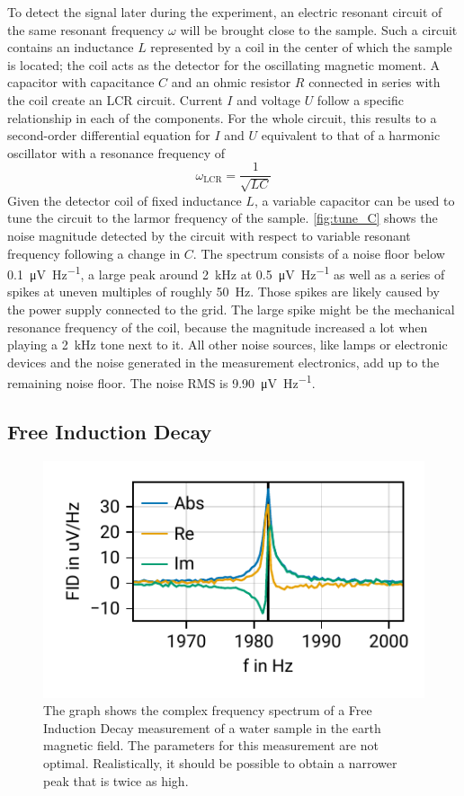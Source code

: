 \documentclass[
    parskip=half, 
    twoside=false,
    twocolumn=true,
    fontsize=11pt,
]{scrarticle}
\begin{document}
To detect the signal later during the experiment, an electric resonant circuit of the same resonant frequency $\omega$ will be brought close to the sample. Such a circuit contains an inductance $L$ represented by a coil in the center of which the sample is located; the coil acts as the detector for the oscillating magnetic moment. A capacitor with capacitance $C$ and an ohmic resistor $R$ connected in series with the coil create an LCR circuit. Current $I$ and voltage $U$ follow a specific relationship in each of the components. For the whole circuit, this results to a second-order differential equation for $I$ and $U$ equivalent to that of a harmonic oscillator with a resonance frequency of
\begin{equation}
    \label{eq:LCR_frequency}
    \omega_{\text{LCR}} = \frac{1}{\sqrt{LC}}
\end{equation}
Given the detector coil of fixed inductance $L$, a variable capacitor can be used to tune the circuit to the larmor frequency of the sample. \autoref{fig:tune_C} shows the noise magnitude detected by the circuit with respect to variable resonant frequency following a change in $C$. The spectrum consists of a noise floor below \SI{0.1}{\micro \volt \per \hertz}, a large peak around \SI{2}{\kilo \hertz} at \SI{0.5}{\micro \volt \per \hertz} as well as a series of spikes at uneven multiples of roughly \SI{50}{\hertz}. Those spikes are likely caused by the power supply connected to the grid. The large spike might be the mechanical resonance frequency of the coil, because the magnitude increased a lot when playing a \SI{2}{\kilo \hertz} tone next to it. All other noise sources, like lamps or electronic devices and the noise generated in the measurement electronics, add up to the remaining noise floor.
The noise RMS is \SI{9.90}{\micro \volt \per \hertz}.

\subsection{Free Induction Decay}
\begin{figure}
    \centering
    \includegraphics{figures/02 fid.pdf}
    \caption{The graph shows the complex frequency spectrum of a Free Induction Decay measurement of a water sample in the earth magnetic field. The parameters for this measurement are not optimal. Realistically, it should be possible to obtain a narrower peak that is twice as high.}
    \label{fig:FID}
\end{figure}
\end{document}
